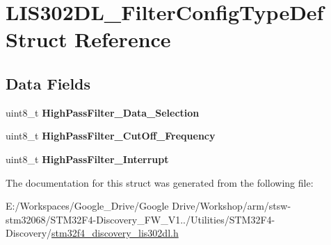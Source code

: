 \hypertarget{struct_l_i_s302_d_l___filter_config_type_def}{\section{L\-I\-S302\-D\-L\-\_\-\-Filter\-Config\-Type\-Def Struct Reference}
\label{struct_l_i_s302_d_l___filter_config_type_def}
}
\subsection*{Data Fields}
\begin{DoxyCompactItemize}
\item 
\hypertarget{struct_l_i_s302_d_l___filter_config_type_def_aa9180d5a5cc7e76e11a0515c128ce21d}{uint8\-\_\-t {\bfseries High\-Pass\-Filter\-\_\-\-Data\-\_\-\-Selection}}\label{struct_l_i_s302_d_l___filter_config_type_def_aa9180d5a5cc7e76e11a0515c128ce21d}

\item 
\hypertarget{struct_l_i_s302_d_l___filter_config_type_def_a01666abb56da76f1507943b9b8403bf8}{uint8\-\_\-t {\bfseries High\-Pass\-Filter\-\_\-\-Cut\-Off\-\_\-\-Frequency}}\label{struct_l_i_s302_d_l___filter_config_type_def_a01666abb56da76f1507943b9b8403bf8}

\item 
\hypertarget{struct_l_i_s302_d_l___filter_config_type_def_a1503fd0c75ed03ee4b4dba09cf0f506e}{uint8\-\_\-t {\bfseries High\-Pass\-Filter\-\_\-\-Interrupt}}\label{struct_l_i_s302_d_l___filter_config_type_def_a1503fd0c75ed03ee4b4dba09cf0f506e}

\end{DoxyCompactItemize}


The documentation for this struct was generated from the following file\-:\begin{DoxyCompactItemize}
\item 
E\-:/\-Workspaces/\-Google\-\_\-\-Drive/\-Google Drive/\-Workshop/arm/stsw-\/stm32068/\-S\-T\-M32\-F4-\/\-Discovery\-\_\-\-F\-W\-\_\-\-V1../\-Utilities/\-S\-T\-M32\-F4-\/\-Discovery/\hyperlink{stm32f4__discovery__lis302dl_8h}{stm32f4\-\_\-discovery\-\_\-lis302dl.\-h}\end{DoxyCompactItemize}

